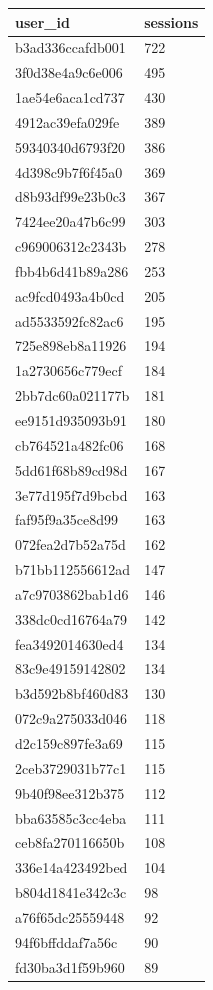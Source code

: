 \begin{tabular}{ll}
\toprule
user\_id & sessions \\
\midrule
b3ad336ccafdb001 & 722 \\
3f0d38e4a9c6e006 & 495 \\
1ae54e6aca1cd737 & 430 \\
4912ac39efa029fe & 389 \\
59340340d6793f20 & 386 \\
4d398c9b7f6f45a0 & 369 \\
d8b93df99e23b0c3 & 367 \\
7424ee20a47b6c99 & 303 \\
c969006312c2343b & 278 \\
fbb4b6d41b89a286 & 253 \\
ac9fcd0493a4b0cd & 205 \\
ad5533592fc82ac6 & 195 \\
725e898eb8a11926 & 194 \\
1a2730656c779ecf & 184 \\
2bb7dc60a021177b & 181 \\
ee9151d935093b91 & 180 \\
cb764521a482fc06 & 168 \\
5dd61f68b89cd98d & 167 \\
3e77d195f7d9bcbd & 163 \\
faf95f9a35ce8d99 & 163 \\
072fea2d7b52a75d & 162 \\
b71bb112556612ad & 147 \\
a7c9703862bab1d6 & 146 \\
338dc0cd16764a79 & 142 \\
fea3492014630ed4 & 134 \\
83c9e49159142802 & 134 \\
b3d592b8bf460d83 & 130 \\
072c9a275033d046 & 118 \\
d2c159c897fe3a69 & 115 \\
2ceb3729031b77c1 & 115 \\
9b40f98ee312b375 & 112 \\
bba63585c3cc4eba & 111 \\
ceb8fa270116650b & 108 \\
336e14a423492bed & 104 \\
b804d1841e342c3c & 98 \\
a76f65dc25559448 & 92 \\
94f6bffddaf7a56c & 90 \\
fd30ba3d1f59b960 & 89 \\

\end{tabular}

